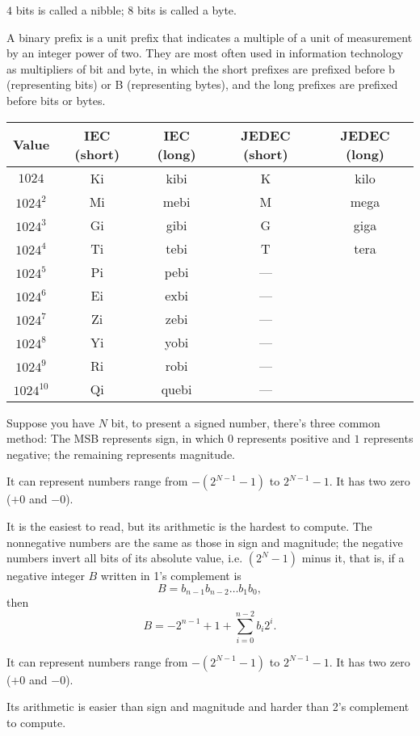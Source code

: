 \documentclass[a4paper,12pt]{report}
\begin{document}
$4$ bits is called a nibble; $8$ bits is called a byte.

A binary prefix is a unit prefix that indicates a multiple of a unit of measurement by an integer power of two. They are most often used in information technology as multipliers of bit and byte, in which the short prefixes are prefixed before b (representing bits) or B (representing bytes), and the long prefixes are prefixed before bits or bytes.
\begin{longtable}[c]{|c|c|c|c|c|}
\hline
Value & IEC (short) & IEC (long) & JEDEC (short) & JEDEC (long)\\\hline
$1024$ & Ki & kibi & K & kilo\\\hline
$1024^2$ & Mi & mebi & M & mega\\\hline
$1024^3$ & Gi & gibi & G & giga\\\hline
$1024^4$ & Ti & tebi & T & tera\\\hline
$1024^5$ & Pi & pebi & —\\\hline
$1024^6$ & Ei & exbi & —\\\hline
$1024^7$ & Zi & zebi & —\\\hline
$1024^8$ & Yi & yobi & —\\\hline
$1024^9$ & Ri & robi & —\\\hline
$1024^10$ & Qi & quebi & —\\\hline
\end{longtable}\FB
{}
Suppose you have $N$ bit, to present a signed number, there's three common method:
The MSB represents sign, in which $0$ represents positive and $1$ represents negative; the remaining represents magnitude. 

It can represent numbers range from $-(2^{N-1}-1)$ to $2^{N-1}-1$. It has two zero ($+0$ and $-0$).

It is the easiest to read, but its arithmetic is the hardest to compute.
The nonnegative numbers are the same as those in sign and magnitude; the negative numbers invert all bits of its absolute value, i.e. $(2^N-1)$ minus it, that is, if a negative integer $B$ written in 1's complement is
\[B=b_{n-1}b_{n-2}\ldots b_1b_0,\]
then
\[B=-2^{n-1}+1+\sum_{i=0}^{n-2}b_i2^i.\]

It can represent numbers range from $-(2^{N-1}-1)$ to $2^{N-1}-1$. It has two zero ($+0$ and $-0$). 

Its arithmetic is easier than sign and magnitude and harder than 2's complement to compute. 
\end{document}
